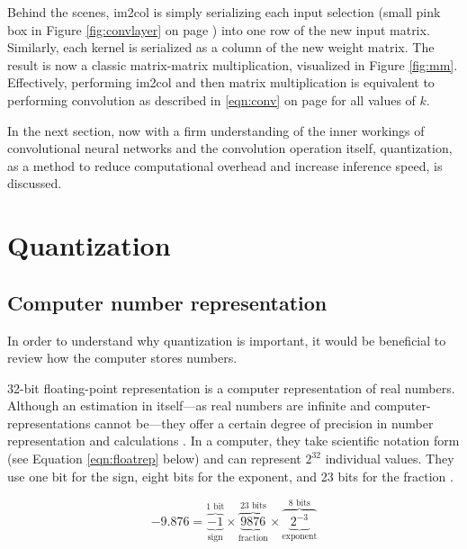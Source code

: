 Behind the scenes, im2col is simply serializing each input selection (small pink box in Figure \ref{fig:convlayer} on page \pageref{fig:convlayer}) into one row of the new input matrix. Similarly, each kernel is serialized as a column of the new weight matrix. The result is now a classic matrix-matrix multiplication, visualized in Figure \ref{fig:mm}. Effectively, performing im2col and then matrix multiplication is equivalent to performing convolution as described in \ref{eqn:conv} on page \pageref{eqn:conv} for all values of $k$.


In the next section, now with a firm understanding of the inner workings of convolutional neural networks and the convolution operation itself, quantization, as a method to reduce computational overhead and increase inference speed, is discussed.

\section{Quantization}
\subsection{Computer number representation}
In order to understand why quantization is important, it would be beneficial to review how the computer stores numbers.

32-bit floating-point representation is a computer representation of real numbers. Although an estimation in itself---as real numbers are infinite and computer-representations cannot be---they offer a certain degree of precision in number representation and calculations \cite{ieee}. In a computer, they take scientific notation form (see Equation \ref{eqn:floatrep} below) and can represent $2^{32}$ individual values. They use one bit for the sign, eight bits for the exponent, and 23 bits for the fraction \cite{ieee}.

\begin{equation}
\label{eqn:floatrep}
-9.876 = \overbrace{\underbrace{-1}_\text{sign}}^\text{1 bit}\times\overbrace{\underbrace{9876}_\text{fraction}}^\text{23 bits}\times\overbrace{\underbrace{2^{-3}}_\text{exponent}}^\text{8 bits}
\end{equation}

